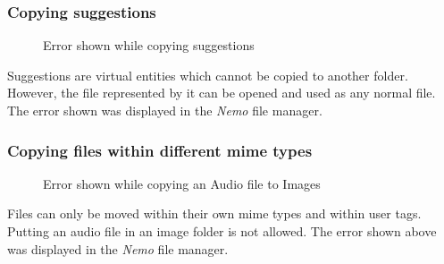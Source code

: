 \subsubsection{Copying suggestions}
\begin{figure}[htb]
\centering
\setlength\fboxsep{0pt}
\setlength\fboxrule{0.5pt}
\caption{Error shown while copying suggestions}
\label{fig:dfd0}
\end{figure}
Suggestions are virtual entities which cannot be copied to another folder. However, the file represented by it can be opened and used as any normal file. The error shown was displayed in the \emph{Nemo} file manager.

\subsubsection{Copying files within different mime types}
\begin{figure}[htb]
\centering
\setlength\fboxsep{0pt}
\setlength\fboxrule{0.5pt}
\caption{Error shown while copying an Audio file to Images}
\label{fig:dfd0}
\end{figure}
Files can only be moved within their own mime types and within user tags. Putting an audio file in an image folder is not allowed. The error shown above was displayed in the \emph{Nemo} file manager.

